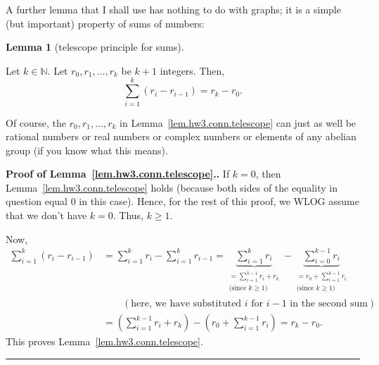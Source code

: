 \documentclass[numbers=enddot,12pt,final,onecolumn,notitlepage]{scrartcl}%
\theoremstyle{definition}
\newtheorem{lem}[theo]{Lemma}
\newenvironment{lemma}[1][]
{\begin{lem}[#1]\begin{leftbar}}
{\end{leftbar}\end{lem}}
\newenvironment{proof}[1][Proof]{\noindent\textbf{#1.} }{\ \rule{0.5em}{0.5em}}
\let\sumnonlimits\sum
\renewcommand{\sum}{\sumnonlimits\limits}
\newcommand{\NN}{\mathbb{N}}
\newcommand{\tup}[1]{\left( #1 \right)}
\newcommand{\underbrack}[2]{\underbrace{#1}_{\substack{#2}}}
\begin{document}
A further lemma that I shall use has nothing to do with graphs;
it is a simple (but important) property of sums of numbers:

\begin{lemma}[telescope principle for sums] 
\label{lem.hw3.conn.telescope}
Let $k \in \NN$.
Let $r_0, r_1, \ldots, r_k$ be $k+1$ integers.
Then,
\[
\sum_{i=1}^k \tup{r_i - r_{i-1}} = r_k - r_0 .
\]
\end{lemma}

Of course, the $r_0, r_1, \ldots, r_k$ in
Lemma~\ref{lem.hw3.conn.telescope} can just as well be
rational numbers or real numbers or complex numbers or elements
of any abelian group (if you know what this means).

\begin{proof}[Proof of Lemma~\ref{lem.hw3.conn.telescope}.]
If $k = 0$, then Lemma~\ref{lem.hw3.conn.telescope} holds
(because both sides of the equality in question equal $0$
in this case).
Hence, for the rest of this proof, we WLOG assume that we
don't have $k = 0$.
Thus, $k \geq 1$.

Now,
\begin{align*}
\sum_{i=1}^k \tup{r_i - r_{i-1}}
&= \sum_{i=1}^k r_i
   - \sum_{i=1}^k r_{i-1}
= \underbrack{\sum_{i=1}^k r_i}
              {= \sum_{i=1}^{k-1} r_i + r_k \\
                \text{(since } k \geq 1 \text{)}}
   - \underbrack{\sum_{i=0}^{k-1} r_i}
                {= r_0 + \sum_{i=1}^{k-1} r_i \\
                  \text{(since } k \geq 1 \text{)}}
\\
&\qquad \left(\text{here, we have substituted } i \text{ for }
                i-1 \text{ in the second sum}\right)
\\
&= \tup{\sum_{i=1}^{k-1} r_i + r_k}
 - \tup{r_0 + \sum_{i=1}^{k-1} r_i}
= r_k - r_0 .
\end{align*}
This proves Lemma~\ref{lem.hw3.conn.telescope}.
\end{proof}
\end{document}
